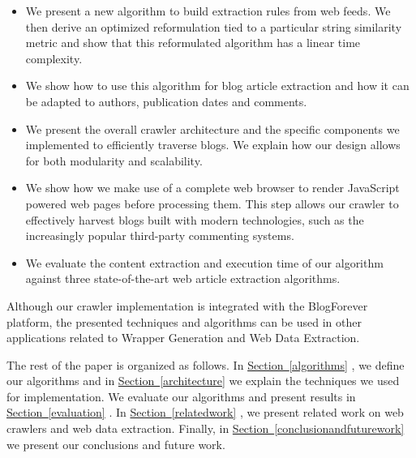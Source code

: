 \begin{itemize}
  \item We present a new algorithm to build extraction rules from web feeds. We then derive an optimized reformulation tied to a particular string similarity metric and show that this reformulated algorithm has a linear time complexity.
  \item We show how to use this algorithm for blog article extraction and how it can be adapted to authors, publication dates and comments.
  \item We present the overall crawler architecture and the specific components we implemented to efficiently traverse blogs. We explain how our design allows for both modularity and scalability.
  \item We show how we make use of a complete web browser to render JavaScript powered web pages before processing them. This step allows our crawler to effectively harvest blogs built with modern technologies, such as the increasingly popular third-party commenting systems.
  \item We evaluate the content extraction and execution time of our algorithm against three state-of-the-art web article extraction algorithms.
\end{itemize}
  

Although our crawler implementation is integrated with the BlogForever platform, the presented techniques and algorithms can be used in other applications related to Wrapper Generation and Web Data Extraction.

The rest of the paper is organized as follows. In \hyperref[algorithms]{Section~\ref*{algorithms}}  , we define our algorithms and in \hyperref[techniques]{Section~\ref*{architecture}}   we explain the techniques we used for implementation. We evaluate our algorithms and present results in \hyperref[evaluation]{Section~\ref*{evaluation}} . In \hyperref[relatedwork]{Section~\ref*{relatedwork}}  , we present related work on web crawlers and web data extraction. Finally, in \hyperref[conclusionandfuturework]{Section~\ref*{conclusionandfuturework}}  we present our conclusions and future work.
